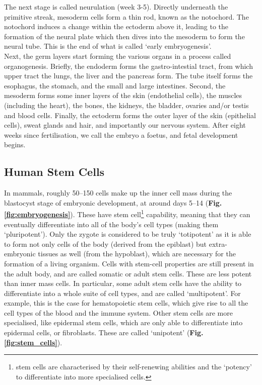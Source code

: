 The next stage is called neurulation (week 3-5).
Directly underneath the primitive streak, mesoderm cells form a thin rod, known as the notochord.
The notochord induces a change within the ectoderm above it, leading to the formation of the neural plate which then dives into the mesoderm to form the neural tube.
This is the end of what is called `early embryogenesis'.\\

Next, the germ layers start forming the various organs in a process called organogenesis.
Briefly, the endoderm forms the gastro-intestial tract, from which upper tract the lungs, the liver and the pancreas form. 
The tube itself forms the esophagus, the stomach, and the small and large intestines.
Second, the mesoderm forms some inner layers of the skin (endothelial cells), the muscles (including the heart), the bones, the kidneys, the bladder, ovaries and/or testis and blood cells.
Finally, the ectoderm forms the outer layer of the skin (epithelial cells), sweat glands and hair, and importantly our nervous system.
After eight weeks since fertilisation, we call the embryo a foetus, and fetal development begins.

\subsection{Human Stem Cells}
\label{sec:escs} 

In mammals, roughly 50–150 cells make up the inner cell mass during the blastocyst stage of embryonic development, at around days 5–14 (\textbf{Fig. \ref{fig:embryogenesis}}). 
These have stem cell\footnote{stem cells are characterised by their self-renewing abilities and the `potency' to differentiate into more specialised cells.} capability, meaning that they can eventually differentiate into all of the body's cell types (making them `pluripotent').
Only the zygote is considered to be truly `totipotent' as it is able to form not only cells of the body (derived from the epiblast) but extra-embryonic tissues as well (from the hypoblast), which are necessary for the formation of a living organism.
Cells with stem-cell properties are still present in the adult body, and are called somatic or adult stem cells.
These are less potent than inner mass cells.
In particular, some adult stem cells have the ability to differentiate into a whole suite of cell types, and are called `multipotent'.
For example, this is the case for hematopoietic stem cells, which give rise to all the cell types of the blood and the immune system.
Other stem cells are more specialised, like epidermal stem cells, which are only able to differentiate into epidermal cells, or fibroblasts.
These are called `unipotent' (\textbf{Fig. \ref{fig:stem_cells}}).\\

